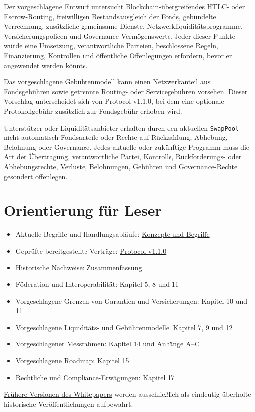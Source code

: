 \documentclass[11pt]{article}
\begin{document}
Der vorgeschlagene Entwurf untersucht Blockchain-übergreifendes HTLC- oder Escrow-Routing, freiwilligen Bestandsausgleich der Fonds, gebündelte Verrechnung, zusätzliche gemeinsame Dienste, Netzwerkliquiditätsprogramme, Versicherungspolicen und Governance-Vermögenswerte. Jeder dieser Punkte würde eine Umsetzung, verantwortliche Parteien, beschlossene Regeln, Finanzierung, Kontrollen und öffentliche Offenlegungen erfordern, bevor er angewendet werden könnte.

Das vorgeschlagene Gebührenmodell kann einen Netzwerkanteil aus Fondsgebühren sowie getrennte Routing- oder Servicegebühren vorsehen. Dieser Vorschlag unterscheidet sich von Protocol v1.1.0, bei dem eine optionale Protokollgebühr zusätzlich zur Fondsgebühr erhoben wird.

Unterstützer oder Liquiditätsanbieter erhalten durch den aktuellen \texttt{SwapPool} nicht automatisch Fondsanteile oder Rechte auf Rückzahlung, Abhebung, Belohnung oder Governance. Jedes aktuelle oder zukünftige Programm muss die Art der Übertragung, verantwortliche Partei, Kontrolle, Rückforderungs- oder Abhebungsrechte, Verluste, Belohnungen, Gebühren und Governance-Rechte gesondert offenlegen.

\section*{Orientierung für Leser}

\begin{itemize}[leftmargin=*]
\item Aktuelle Begriffe und Handlungsabläufe: \href{https://docs.cosmolocal.credit/de/introduction/concepts}{Konzepte und Begriffe}
\item Geprüfte bereitgestellte Verträge: \href{https://docs.cosmolocal.credit/de/protocol/overview}{Protocol v1.1.0}
\item Historische Nachweise: \href{https://docs.cosmolocal.credit/de/white-paper/executive-summary}{Zusammenfassung}
\item Föderation und Interoperabilität: Kapitel 5, 8 und 11
\item Vorgeschlagene Grenzen von Garantien und Versicherungen: Kapitel 10 und 11
\item Vorgeschlagene Liquiditäts- und Gebührenmodelle: Kapitel 7, 9 und 12
\item Vorgeschlagener Messrahmen: Kapitel 14 und Anhänge A--C
\item Vorgeschlagene Roadmap: Kapitel 15
\item Rechtliche und Compliance-Erwägungen: Kapitel 17
\end{itemize}
\href{https://docs.cosmolocal.credit/de/white-paper/archive}{Frühere Versionen des Whitepapers} werden ausschließlich als eindeutig überholte historische Veröffentlichungen aufbewahrt.
\end{document}
